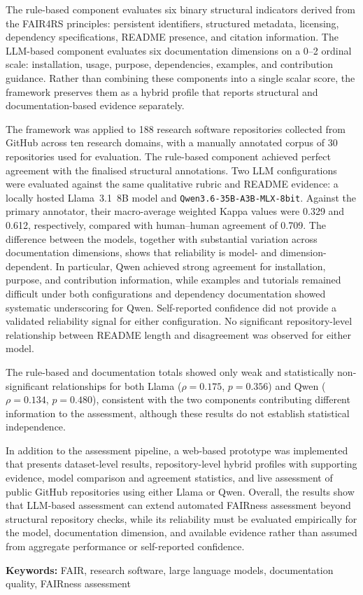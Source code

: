 \documentclass[a4paper, 12pt, oneside, BCOR1cm,toc=chapterentrywithdots]{scrbook}
\renewcommand*{\tableofcontents}{%
    \begingroup
    \tocsection
    \tocfile{\contentsname}{toc}
    \endgroup
}
\renewcommand*{\listoffigures}{%
    \begingroup
    \tocsection
    \tocfile{\listfigurename}{lof}
    \endgroup
}
\renewcommand{\listoftables}{
    \begingroup
    \tocsection
    \tocfile{\listtablename}{lot}
    \endgroup
}
\begin{document}
The rule-based component evaluates six binary structural indicators
derived from the FAIR4RS principles: persistent identifiers,
structured metadata, licensing, dependency specifications, README
presence, and citation information. The LLM-based component evaluates
six documentation dimensions on a 0--2 ordinal scale: installation,
usage, purpose, dependencies, examples, and contribution guidance.
Rather than combining these components into a single scalar score,
the framework preserves them as a hybrid profile that reports
structural and documentation-based evidence separately.

The framework was applied to 188 research software repositories
collected from GitHub across ten research domains, with a manually
annotated corpus of 30 repositories used for evaluation. The
rule-based component achieved perfect agreement with the finalised
structural annotations. Two LLM configurations were evaluated against
the same qualitative rubric and README evidence: a locally hosted
Llama~3.1~8B model and
\texttt{Qwen3.6-35B-A3B-MLX-8bit}. Against the primary annotator,
their macro-average weighted Kappa values were 0.329 and 0.612,
respectively, compared with human--human agreement of 0.709. The
difference between the models, together with substantial variation
across documentation dimensions, shows that reliability is
model- and dimension-dependent. In particular, Qwen achieved strong
agreement for installation, purpose, and contribution information,
while examples and tutorials remained difficult under both
configurations and dependency documentation showed systematic
underscoring for Qwen. Self-reported confidence did not provide a
validated reliability signal for either configuration. No significant
repository-level relationship between README length and disagreement
was observed for either model.

The rule-based and documentation totals showed only weak and
statistically non-significant relationships for both Llama
($\rho=0.175$, $p=0.356$) and Qwen
($\rho=0.134$, $p=0.480$), consistent with the two components
contributing different information to the assessment, although these
results do not establish statistical independence.

In addition to the assessment pipeline, a web-based prototype was
implemented that presents dataset-level results, repository-level
hybrid profiles with supporting evidence, model comparison and
agreement statistics, and live assessment of public GitHub
repositories using either Llama or Qwen. Overall, the results show
that LLM-based assessment can extend automated FAIRness assessment
beyond structural repository checks, while its reliability must be
evaluated empirically for the model, documentation dimension, and
available evidence rather than assumed from aggregate performance or
self-reported confidence.
\par
\medskip
\noindent\textbf{Keywords:} FAIR, research software, large language models,
documentation quality, FAIRness assessment
\tableofcontents
\listoffigures
\listoftables
\end{document}

